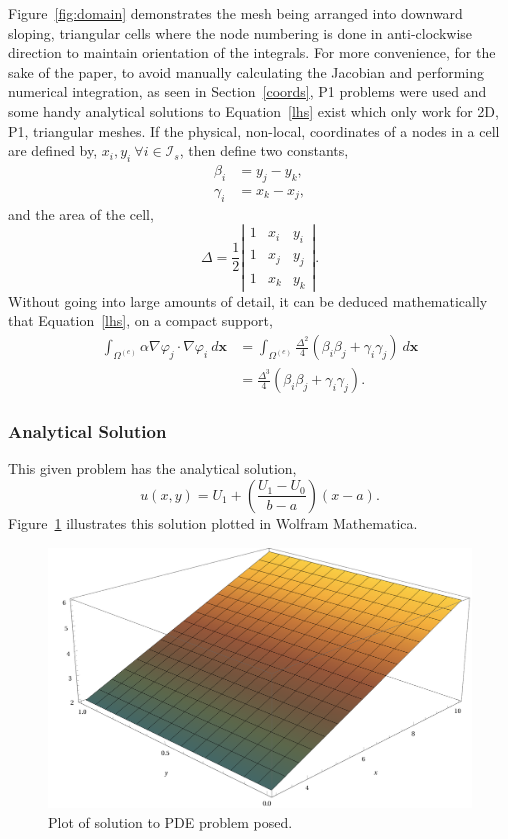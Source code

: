 Figure~\ref{fig:domain} demonstrates the mesh being arranged into downward sloping, triangular cells where the node numbering is done in anti-clockwise direction to maintain orientation of the integrals. For more convenience, for the sake of the paper, to avoid manually calculating the Jacobian and performing numerical integration, as seen in Section~\ref{coords}, P1 problems were used and some handy analytical solutions to Equation~\eqref{lhs} exist which only work for 2D, P1, triangular meshes. If the physical, non-local, coordinates of a nodes in a cell are defined by, $x_i, y_i~\forall i \in \mathcal{I}_s$, then define two constants,
\begin{align}
	\beta_i &= y_j - y_k,\\
	\gamma_i &= x_k - x_j,
\end{align} 
and the area of the cell,
\begin{equation}
	\Delta = \frac{1}{2}\left\vert
	\begin{matrix}
		1 & x_i & y_i \\
		1 & x_j & y_j \\
		1 & x_k & y_k
	\end{matrix}\right\vert.
\end{equation}
Without going into large amounts of detail, it can be deduced mathematically that Equation~\eqref{lhs}, on a compact support,
\begin{align}
	\int_{\Omega^{(e)}} \alpha \nabla \varphi_j \cdot \nabla \varphi_i~d\mathbf{x} &= \int_{\Omega^{(e)}}\frac{\Delta^2}{4}(\beta_i\beta_j + \gamma_i\gamma_j)~d\mathbf{x}\\
	&= \frac{\Delta^3}{4}(\beta_i\beta_j + \gamma_i\gamma_j).\label{conv}
\end{align}

\subsubsection{Analytical Solution}

This given problem has the analytical solution,
\begin{equation}
	u(x,y) = U_1 + \left(\frac{U_1 - U_0}{b - a}\right) (x - a).
\end{equation}
Figure~\ref{fig:soln} illustrates this solution plotted in Wolfram Mathematica.
\begin{figure}
	\centering
	\includegraphics[width=0.6\linewidth]{Figures/soln}
	\caption{Plot of solution to PDE problem posed.}
	\label{fig:soln}
\end{figure}

